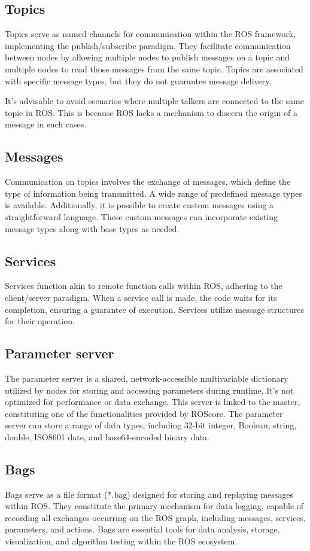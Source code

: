 \subsection{Topics}
Topics serve as named channels for communication within the ROS framework, implementing the publish/subscribe paradigm. 
They facilitate communication between nodes by allowing multiple nodes to publish messages on a topic and multiple nodes to read those messages from the same topic. 
Topics are associated with specific message types, but they do not guarantee message delivery.

It's advisable to avoid scenarios where multiple talkers are connected to the same topic in ROS.\@
This is because ROS lacks a mechanism to discern the origin of a message in such cases.

\subsection{Messages}
Communication on topics involves the exchange of messages, which define the type of information being transmitted. 
A wide range of predefined message types is available.
Additionally, it is possible to create custom messages using a straightforward language. 
These custom messages can incorporate existing message types along with base types as needed.

\subsection{Services}
Services function akin to remote function calls within ROS, adhering to the client/server paradigm. 
When a service call is made, the code waits for its completion, ensuring a guarantee of execution. 
Services utilize message structures for their operation.

\subsection{Parameter server}
The parameter server is a shared, network-accessible multivariable dictionary utilized by nodes for storing and accessing parameters during runtime. 
It's not optimized for performance or data exchange. 
This server is linked to the master, constituting one of the functionalities provided by ROScore.
The parameter server can store a range of data types, including 32-bit integer, Boolean, string, double, ISO8601 date, and base64-encoded binary data.

\subsection{Bags}
Bags serve as a file format (*.bag) designed for storing and replaying messages within ROS.\@ 
They constitute the primary mechanism for data logging, capable of recording all exchanges occurring on the ROS graph, including messages, services, parameters, and actions. 
Bags are essential tools for data analysis, storage, visualization, and algorithm testing within the ROS ecosystem.

